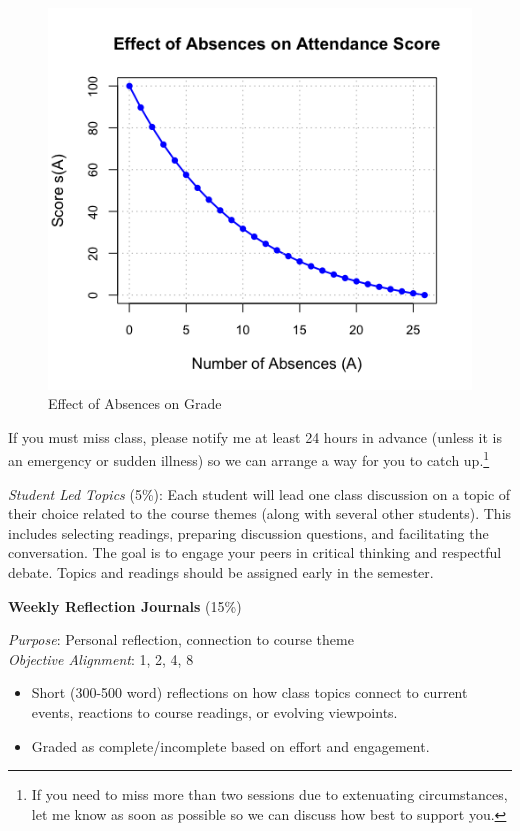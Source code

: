 \documentclass[]{tufte-handout}
\providecommand{\tightlist}{%
  \setlength{\itemsep}{0pt}\setlength{\parskip}{0pt}}
\begin{document}
\begin{figure}
\centering
\includegraphics{readme_files/figure-gfm/attendance-curve-1.png}
\caption{Effect of Absences on Grade}
\end{figure}

If you must miss class, please notify me at least 24 hours in advance
(unless it is an emergency or sudden illness) so we can arrange a way
for you to catch up.\footnote{If you need to miss more than two sessions
  due to extenuating circumstances, let me know as soon as possible so
  we can discuss how best to support you.}

\emph{Student Led Topics} (5\%): Each student will lead one class
discussion on a topic of their choice related to the course themes
(along with several other students). This includes selecting readings,
preparing discussion questions, and facilitating the conversation. The
goal is to engage your peers in critical thinking and respectful debate.
Topics and readings should be assigned early in the semester.

\textbf{Weekly Reflection Journals} (15\%)

\emph{Purpose}: Personal reflection, connection to course theme\\
\emph{Objective Alignment}: 1, 2, 4, 8

\begin{itemize}
\tightlist
\item
  Short (300-500 word) reflections on how class topics connect to
  current events, reactions to course readings, or evolving viewpoints.
\item
  Graded as complete/incomplete based on effort and engagement.
\end{itemize}
\end{document}
